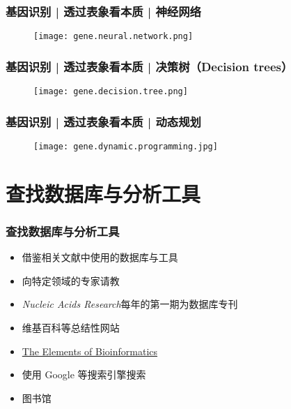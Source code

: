 \begin{frame}
  \frametitle{基因识别 | 透过表象看本质 | 神经网络}
  \begin{figure}
    \centering
    \texttt{[image: gene.neural.network.png]}
  \end{figure}
\end{frame}

\begin{frame}
  \frametitle{基因识别 | 透过表象看本质 | 决策树（Decision trees）}
  \begin{figure}
    \centering
    \texttt{[image: gene.decision.tree.png]}
  \end{figure}
\end{frame}

\begin{frame}
  \frametitle{基因识别 | 透过表象看本质 | 动态规划}
  \begin{figure}
    \centering
    \texttt{[image: gene.dynamic.programming.jpg]}
  \end{figure}
\end{frame}

\section{查找数据库与分析工具}
\begin{frame}
  \frametitle{查找数据库与分析工具}
  \pause
  \begin{itemize}
    \item 借鉴相关文献中使用的数据库与工具
    \item 向特定领域的专家请教
    \item \textit{Nucleic Acids Research}每年的第一期为数据库专刊
    \item 维基百科等总结性网站
    \item \href{http://elements.eaglegenomics.com/}{The Elements of Bioinformatics}
    \item 使用 Google 等搜索引擎搜索
    \item 图书馆
  \end{itemize}
\end{frame}

